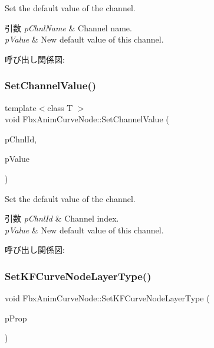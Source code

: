 Set the default value of the channel. 
\begin{DoxyParams}{引数}
{\em p\+Chnl\+Name} & Channel name. \\
\hline
{\em p\+Value} & New default value of this channel. \\
\hline
\end{DoxyParams}
呼び出し関係図\+:
\mbox{\label{class_fbx_anim_curve_node_aceef8634351d11d9058b5d023de5f5b4}} 
\subsubsection{\texorpdfstring{Set\+Channel\+Value()}{SetChannelValue()}\hspace{0.1cm}{\footnotesize\ttfamily [2/2]}}
{\footnotesize\ttfamily template$<$class T $>$ \\
void Fbx\+Anim\+Curve\+Node\+::\+Set\+Channel\+Value (\begin{DoxyParamCaption}\item[{unsigned int}]{p\+Chnl\+Id,  }\item[{T}]{p\+Value }\end{DoxyParamCaption})}

Set the default value of the channel. 
\begin{DoxyParams}{引数}
{\em p\+Chnl\+Id} & Channel index. \\
\hline
{\em p\+Value} & New default value of this channel. \\
\hline
\end{DoxyParams}
呼び出し関係図\+:
\mbox{\label{class_fbx_anim_curve_node_a9d266fe30162053141dd131a1005abf2}} 
\subsubsection{\texorpdfstring{Set\+K\+F\+Curve\+Node\+Layer\+Type()}{SetKFCurveNodeLayerType()}}
{\footnotesize\ttfamily void Fbx\+Anim\+Curve\+Node\+::\+Set\+K\+F\+Curve\+Node\+Layer\+Type (\begin{DoxyParamCaption}\item[{\hyperlink{class_fbx_property}{Fbx\+Property} \&}]{p\+Prop }\end{DoxyParamCaption})}

